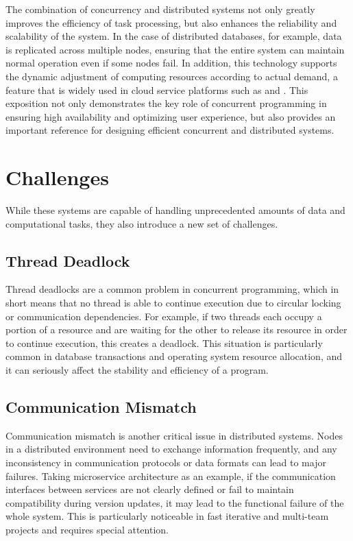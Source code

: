\documentclass{l4proj}
\begin{document}
The combination of concurrency and distributed systems not only greatly improves the efficiency of task processing, but also enhances the reliability and scalability of the system. In the case of distributed databases, for example, data is replicated across multiple nodes, ensuring that the entire system can maintain normal operation even if some nodes fail. In addition, this technology supports the dynamic adjustment of computing resources according to actual demand, a feature that is widely used in cloud service platforms such as \cite{aws_2023_amazon} and \cite{microsoft_2023_cloud}. This exposition not only demonstrates the key role of concurrent programming in ensuring high availability and optimizing user experience, but also provides an important reference for designing efficient concurrent and distributed systems.

\section{Challenges}

While these systems are capable of handling unprecedented amounts of data and computational tasks, they also introduce a new set of challenges. 

\subsection{Thread Deadlock}

Thread deadlocks are a common problem in concurrent programming, which in short means that no thread is able to continue execution due to circular locking or communication dependencies. For example, if two threads each occupy a portion of a resource and are waiting for the other to release its resource in order to continue execution, this creates a deadlock. This situation is particularly common in database transactions and operating system resource allocation, and it can seriously affect the stability and efficiency of a program.

\subsection{Communication Mismatch}

Communication mismatch is another critical issue in distributed systems. Nodes in a distributed environment need to exchange information frequently, and any inconsistency in communication protocols or data formats can lead to major failures. Taking microservice architecture as an example, if the communication interfaces between services are not clearly defined or fail to maintain compatibility during version updates, it may lead to the functional failure of the whole system. This is particularly noticeable in fast iterative and multi-team projects and requires special attention.
\end{document}

